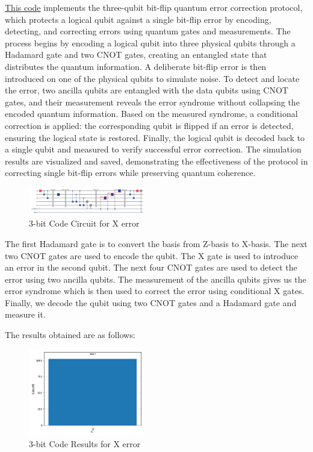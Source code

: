 \documentclass[conference]{IEEEtran}
\begin{document}
\href{https://github.com/jaymehta132/QuantumErrorCorrection-EE7001/blob/main/Codes/scripts/3bitCode.py}{This code} implements the three-qubit bit-flip quantum error correction protocol, which protects a logical qubit against a single bit-flip error by encoding, detecting, and correcting errors using quantum gates and measurements. The process begins by encoding a logical qubit into three physical qubits through a Hadamard gate and two CNOT gates, creating an entangled state that distributes the quantum information. A deliberate bit-flip error is then introduced on one of the physical qubits to simulate noise. To detect and locate the error, two ancilla qubits are entangled with the data qubits using CNOT gates, and their measurement reveals the error syndrome without collapsing the encoded quantum information. Based on the measured syndrome, a conditional correction is applied: the corresponding qubit is flipped if an error is detected, ensuring the logical state is restored. Finally, the logical qubit is decoded back to a single qubit and measured to verify successful error correction. The simulation results are visualized and saved, demonstrating the effectiveness of the protocol in correcting single bit-flip errors while preserving quantum coherence.

\begin{figure}[h]
    \centering
    \includegraphics[width=0.45\textwidth]{../Codes/results/3bitCode/3bitCodeCircuit.png}
    \caption{3-bit Code Circuit for X error}
    \label{fig:3bitCodeCircuit}
\end{figure}

The first Hadamard gate is to convert the basis from Z-basis to X-basis. The next two CNOT gates are used to encode the qubit. The X gate is used to introduce an error in the second qubit. The next four CNOT gates are used to detect the error using two ancilla qubits. The measurement of the ancilla qubits gives us the error syndrome which is then used to correct the error using conditional X gates. Finally, we decode the qubit using two CNOT gates and a Hadamard gate and measure it. 

The results obtained are as follows:
\begin{figure}[h]
    \centering
    \includegraphics[width=0.45\textwidth]{../Codes/results/3bitCode/3bitCodeHistogram.png}
    \caption{3-bit Code Results for X error}
    \label{fig:3bitCodeResults} 
\end{figure}
\end{document}
